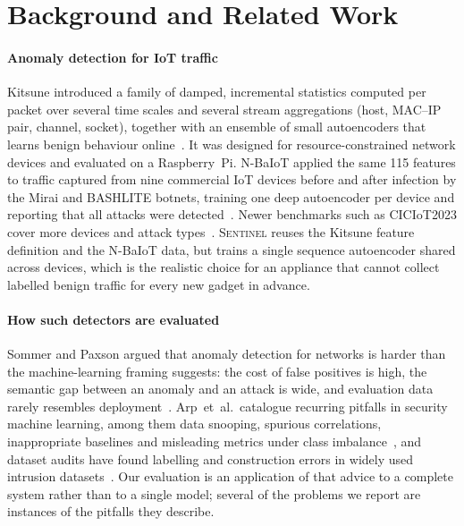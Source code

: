 \section{Background and Related Work}
\label{sec:related}

\paragraph{Anomaly detection for IoT traffic}
Kitsune introduced a family of damped, incremental statistics computed per
packet over several time scales and several stream aggregations (host,
MAC--IP pair, channel, socket), together with an ensemble of small
autoencoders that learns benign behaviour online~\cite{mirsky2018kitsune}. It
was designed for resource-constrained network devices and evaluated on a
Raspberry~Pi. N-BaIoT applied the same 115 features to traffic captured from
nine commercial IoT devices before and after infection by the Mirai and
BASHLITE botnets, training one deep autoencoder per device and reporting that
all attacks were detected~\cite{meidan2018nbaiot}. Newer benchmarks such as
CICIoT2023 cover more devices and attack types~\cite{neto2023ciciot}.
\textsc{Sentinel} reuses the Kitsune feature definition and the N-BaIoT data,
but trains a single sequence autoencoder shared across devices, which is the
realistic choice for an appliance that cannot collect labelled benign traffic
for every new gadget in advance.

\paragraph{How such detectors are evaluated}
Sommer and Paxson argued that anomaly detection for networks is harder than
the machine-learning framing suggests: the cost of false positives is high,
the semantic gap between an anomaly and an attack is wide, and evaluation data
rarely resembles deployment~\cite{sommer2010closedworld}. Arp~et~al.\
catalogue recurring pitfalls in security machine learning, among them data
snooping, spurious correlations, inappropriate baselines and misleading
metrics under class imbalance~\cite{arp2022dosdonts}, and dataset audits have
found labelling and construction errors in widely used intrusion
datasets~\cite{engelen2021cicids}. Our evaluation is an application of that
advice to a complete system rather than to a single model; several of the
problems we report are instances of the pitfalls they describe.

